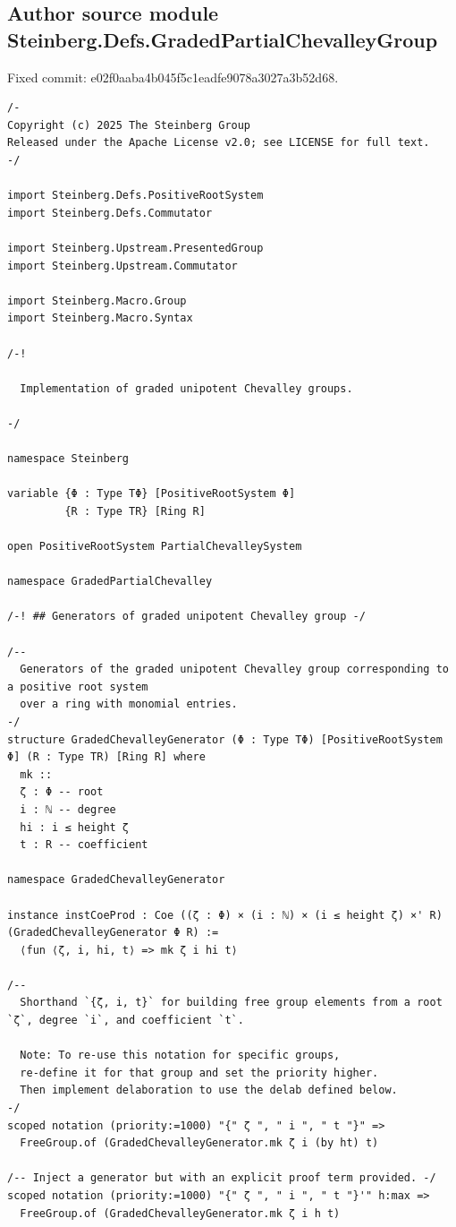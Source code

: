 \subsection*{Author source module Steinberg.Defs.GradedPartialChevalleyGroup}
\noindent Fixed commit: e02f0aaba4b045f5c1eadfe9078a3027a3b52d68.
\begin{Verbatim}
/-
Copyright (c) 2025 The Steinberg Group
Released under the Apache License v2.0; see LICENSE for full text.
-/

import Steinberg.Defs.PositiveRootSystem
import Steinberg.Defs.Commutator

import Steinberg.Upstream.PresentedGroup
import Steinberg.Upstream.Commutator

import Steinberg.Macro.Group
import Steinberg.Macro.Syntax

/-!

  Implementation of graded unipotent Chevalley groups.

-/

namespace Steinberg

variable {Φ : Type TΦ} [PositiveRootSystem Φ]
         {R : Type TR} [Ring R]

open PositiveRootSystem PartialChevalleySystem

namespace GradedPartialChevalley

/-! ## Generators of graded unipotent Chevalley group -/

/--
  Generators of the graded unipotent Chevalley group corresponding to a positive root system
  over a ring with monomial entries.
-/
structure GradedChevalleyGenerator (Φ : Type TΦ) [PositiveRootSystem Φ] (R : Type TR) [Ring R] where
  mk ::
  ζ : Φ -- root
  i : ℕ -- degree
  hi : i ≤ height ζ
  t : R -- coefficient

namespace GradedChevalleyGenerator

instance instCoeProd : Coe ((ζ : Φ) × (i : ℕ) × (i ≤ height ζ) ×' R) (GradedChevalleyGenerator Φ R) :=
  ⟨fun ⟨ζ, i, hi, t⟩ => mk ζ i hi t⟩

/--
  Shorthand `{ζ, i, t}` for building free group elements from a root `ζ`, degree `i`, and coefficient `t`.

  Note: To re-use this notation for specific groups,
  re-define it for that group and set the priority higher.
  Then implement delaboration to use the delab defined below.
-/
scoped notation (priority:=1000) "{" ζ ", " i ", " t "}" =>
  FreeGroup.of (GradedChevalleyGenerator.mk ζ i (by ht) t)

/-- Inject a generator but with an explicit proof term provided. -/
scoped notation (priority:=1000) "{" ζ ", " i ", " t "}'" h:max =>
  FreeGroup.of (GradedChevalleyGenerator.mk ζ i h t)


\end{Verbatim}
